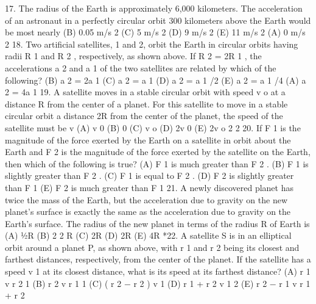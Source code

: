 17. The radius of the Earth is approximately 6,000 kilometers. The acceleration of an astronaut in a perfectly
circular orbit 300 kilometers above the Earth would be most nearly
(B) 0.05 m/s 2
(C) 5 m/s 2
(D) 9 m/s 2
(E) 11 m/s 2
(A) 0 m/s 2
18. Two artificial satellites, 1 and 2, orbit the Earth in circular orbits having radii R 1 and R 2 , respectively, as shown
above. If R 2 = 2R 1 , the accelerations a 2 and a 1 of the two satellites are related by which of the following?
(B) a 2 = 2a 1
(C) a 2 = a 1
(D) a 2 = a 1 /2
(E) a 2 = a 1 /4
(A) a 2 = 4a 1
19. A satellite moves in a stable circular orbit with speed v o at a distance R from the center of a planet. For this
satellite to move in a stable circular orbit a distance 2R from the center of the planet, the speed of the satellite
must be
v
(A) v 0
(B) 0
(C) v o
(D) 2v 0
(E) 2v o
2
2
20. If F 1 is the magnitude of the force exerted by the Earth on a satellite in orbit about the Earth and F 2 is the
magnitude of the force exerted by the satellite on the Earth, then which of the following is true?
(A) F 1 is much greater than F 2 .
(B) F 1 is slightly greater than F 2 .
(C) F 1 is equal to F 2 .
(D) F 2 is slightly greater than F 1 (E) F 2 is much greater than F 1
21. A newly discovered planet has twice the mass of the Earth, but the acceleration due to gravity on the new
planet's surface is exactly the same as the acceleration due to gravity on the Earth's surface. The radius of the
new planet in terms of the radius R of Earth is
(A) 1⁄2R
(B)
2
2
R
(C)
2R
(D) 2R
(E) 4R
*22. A satellite S is in an elliptical orbit around a planet P, as shown above, with r 1 and r 2 being its closest and
farthest distances, respectively, from the center of the planet. If the satellite has a speed v 1 at its closest
distance, what is its speed at its farthest distance?
(A)
r 1
v
r 2 1
(B)
r 2
v
r 1 1
(C)
( r
2
− r 2 ) v 1
(D)
r 1 + r 2
v 1
2
(E)
r 2 − r 1
v
r 1 + r 2


